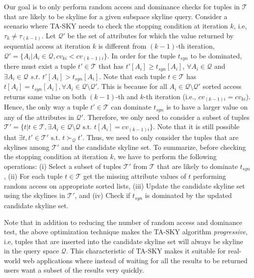 \vspace{1mm}
 Our goal is to only perform random access and dominance checks for tuples in $\mathcal{T}$ that are likely to be skyline for a given subspace skyline query. Consider a scenario where TA-SKY needs to check the stopping condition at iteration $k$, i.e, $\tau_k \neq \tau_{(k-1)}$. Let $\mathcal{Q'}$ be the set of attributes for which the value returned by sequential access at iteration $k$ is different from $(k-1)$-th iteration, $\mathcal{Q'} = \{A_i | A_i \in \mathcal{Q}, cv_{ki} < cv_{(k-1)i} \}$. In order for the tuple $t_{syn}$ to be dominated, there must exist a tuple $t' \in \mathcal{T}$ that has $t'[A_i] \geq t_{syn}[A_i]$, $\forall A_i \in \mathcal{Q}$ and $\exists A_i \in \mathcal{Q}$ $s.t.$ $t'[A_i] > t_{syn}[A_i]$. Note that each tuple $t \in \mathcal{T}$ has $t[A_i] = t_{syn}[A_i], \forall A_i \in \mathcal{Q} \setminus \mathcal{Q'}$. This is because for all $A_i \in \mathcal{Q} \setminus \mathcal{Q'}$ sorted access returns same value on both $(k-1)$-th and $k$-th iteration (i.e., $cv_{(k-1)i} = cv_{ki}$). Hence, the only way a tuple $t' \in \mathcal{T}$ can dominate $t_{syn}$ is to have a larger value on any of the attributes in $\mathcal{Q'}$. Therefore, we only need to consider a subset of tuples $\mathcal{T'} = \{ t | t \in \mathcal{T}, \exists A_i \in \mathcal{Q} \setminus \mathcal{Q} \text{ s.t. } t[A_i] = cv_{(k-1)i} \}$. Note that it is still possible that $\exists t, t' \in \mathcal{T'} \text{ s.t. } t \succ_{\mathcal{Q}} t'$. Thus, we need to only consider the tuples that are skylines among $\mathcal{T'}$ and the candidate skyline set. To summarize, before checking the stopping condition at iteration $k$, we have to perform the following  operations: (i) Select a subset of tuples $\mathcal{T'}$ from $\mathcal{T}$ that are likely to dominate $t_{syn}$, (ii) For each tuple $t \in \mathcal{T}$ get the missing attribute values of $t$ performing random access on appropriate sorted lists, (iii) Update the candidate skyline set using the skylines in $\mathcal{T'}$, and (iv) Check if $t_{syn}$ is dominated by the updated candidate skyline set.

Note that in addition to reducing the number of random access and dominance test, the above optimization technique makes the TA-SKY algorithm {\em progressive}, i.e, tuples that are inserted into the candidate skyline set will always be skyline in the query space $\mathcal{Q}$.
This characteristic of TA-SKY makes it suitable for real-world web applications where instead of waiting for all the results to be returned users want a subset of the results very quickly.

